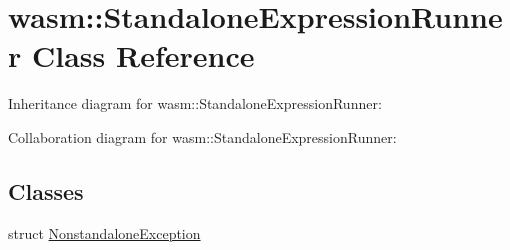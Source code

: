 \hypertarget{classwasm_1_1_standalone_expression_runner}{}\section{wasm\+:\+:Standalone\+Expression\+Runner Class Reference}
\label{classwasm_1_1_standalone_expression_runner}


Inheritance diagram for wasm\+:\+:Standalone\+Expression\+Runner\+:


Collaboration diagram for wasm\+:\+:Standalone\+Expression\+Runner\+:
\subsection*{Classes}
\begin{DoxyCompactItemize}
\item 
struct \mbox{\hyperlink{structwasm_1_1_standalone_expression_runner_1_1_nonstandalone_exception}{Nonstandalone\+Exception}}
\end{DoxyCompactItemize}
